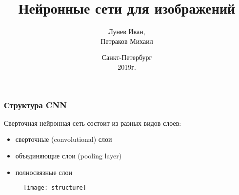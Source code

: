 \documentclass[unicode, notheorems]{beamer}
\title[Нейронные сети для изображений]{Нейронные сети для изображений}
\author[Лунев И., Петраков М.]{Лунев Иван, \\ Петраков Михаил}
\date{
    Санкт-Петербург\\
    2019г.
}
\begin{document}
\begin{frame}
    \titlepage
\end{frame}


 

\begin{frame}
\frametitle{Структура CNN}

Сверточная нейронная сеть состоит из разных видов слоев:

\begin{itemize}
	\item сверточные (convolutional) слои
	\item объединяющие слои (pooling layer)
	\item полносвязные слои
\end{itemize}
\begin{figure}[h]
	\begin{center}
		\begin{minipage}[h]{0.70\linewidth}
			\texttt{[image: structure]}
		\end{minipage}
	\end{center}
\end{figure}

\end{frame}
\end{document}
